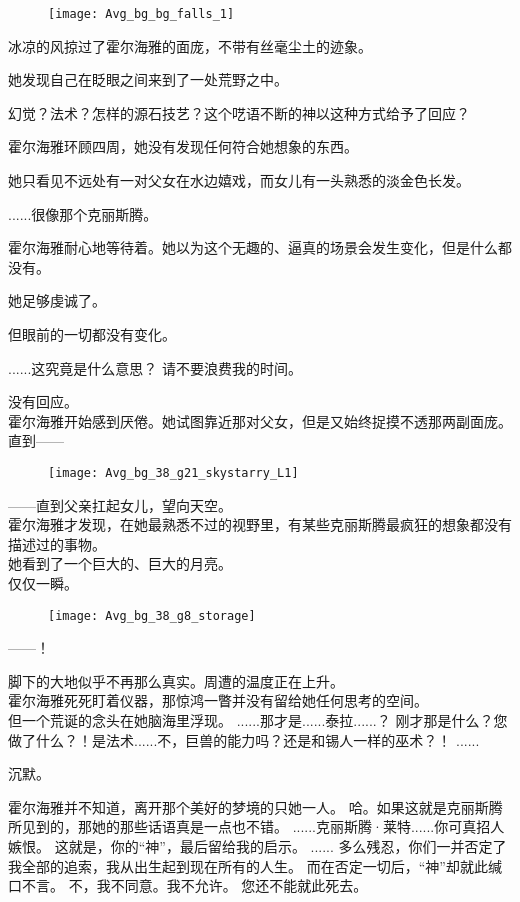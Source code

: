 \documentclass[openany]{book}
\begin{document}
\begin{figure}[h]
    \centering
    \texttt{[image: Avg\_bg\_bg\_falls\_1]}
\end{figure}
冰凉的风掠过了霍尔海雅的面庞，不带有丝毫尘土的迹象。\par
她发现自己在眨眼之间来到了一处荒野之中。\par
幻觉？法术？怎样的源石技艺？这个呓语不断的神以这种方式给予了回应？\par
霍尔海雅环顾四周，她没有发现任何符合她想象的东西。\par
她只看见不远处有一对父女在水边嬉戏，而女儿有一头熟悉的淡金色长发。\par
......很像那个克丽斯腾。\par
霍尔海雅耐心地等待着。她以为这个无趣的、逼真的场景会发生变化，但是什么都没有。\par
她足够虔诚了。\par
但眼前的一切都没有变化。

\begin{dialogue}
     ......这究竟是什么意思？
     请不要浪费我的时间。\par
    没有回应。\\
    霍尔海雅开始感到厌倦。她试图靠近那对父女，但是又始终捉摸不透那两副面庞。\\
    直到——\par
    \begin{figure}[h]
        \centering
        \texttt{[image: Avg\_bg\_38\_g21\_skystarry\_L1]}
    \end{figure}
    ——直到父亲扛起女儿，望向天空。\\
    霍尔海雅才发现，在她最熟悉不过的视野里，有某些克丽斯腾最疯狂的想象都没有描述过的事物。\\
    她看到了一个巨大的、巨大的月亮。\\
    仅仅一瞬。
    \begin{figure}[h]
        \centering
        \texttt{[image: Avg\_bg\_38\_g8\_storage]}
    \end{figure}
     ——！\par
    脚下的大地似乎不再那么真实。周遭的温度正在上升。\\
    霍尔海雅死死盯着仪器，那惊鸿一瞥并没有留给她任何思考的空间。\\
    但一个荒诞的念头在她脑海里浮现。
     ......那才是......泰拉......？
     刚才那是什么？您做了什么？！是法术......不，巨兽的能力吗？还是和锡人一样的巫术？！
     ......\par
    沉默。\par
    霍尔海雅并不知道，离开那个美好的梦境的只她一人。
     哈。如果这就是克丽斯腾所见到的，那她的那些话语真是一点也不错。
     ......克丽斯腾·莱特......你可真招人嫉恨。
     这就是，你的“神”，最后留给我的启示。
     ......
     多么残忍，你们一并否定了我全部的追索，我从出生起到现在所有的人生。
     而在否定一切后，“神”却就此缄口不言。
     不，我不同意。我不允许。
     您还不能就此死去。
\end{dialogue}
\end{document}
